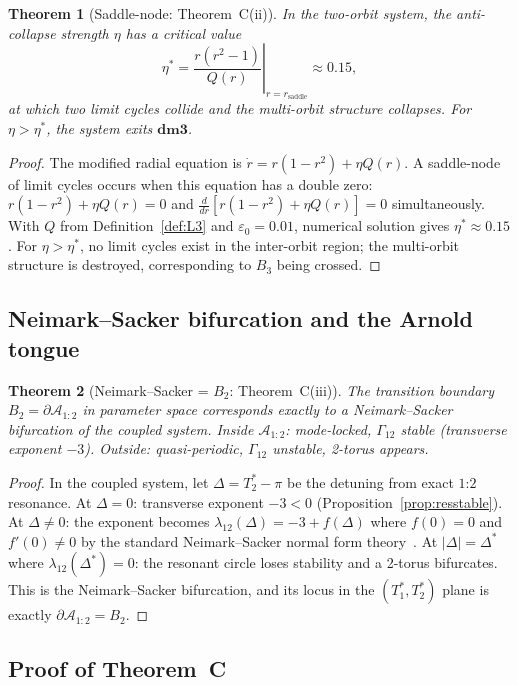\documentclass[12pt, oneside]{book}
\theoremstyle{plain}
\newtheorem{theorem}{Theorem}[section]
\theoremstyle{definition}
\theoremstyle{remark}
\newcommand{\dmcat}{\mathbf{dm3}}
\newcommand{\Orb}{\Gamma}
\newcommand{\eps}{\varepsilon}
\newcommand{\abs}[1]{\left|#1\right|}
\begin{document}
\begin{theorem}[Saddle-node: Theorem~C(ii)]\label{thm:saddle}
In the two-orbit system, the anti-collapse strength $\eta$ has a
critical value
\[
  \eta^* = \left.\frac{r(r^2-1)}{Q(r)}\right|_{r=r_{\mathrm{saddle}}}
  \approx 0.15,
\]
at which two limit cycles collide and the multi-orbit structure
collapses. For $\eta>\eta^*$, the system exits $\dmcat$.
\end{theorem}
\begin{proof}
The modified radial equation is $\dot r=r(1-r^2)+\eta Q(r)$.
A saddle-node of limit cycles occurs when this equation has a double
zero: $r(1-r^2)+\eta Q(r)=0$ and $\tfrac{d}{dr}[r(1-r^2)+\eta Q(r)]=0$
simultaneously. With $Q$ from Definition~\ref{def:L3} and $\eps_0=0.01$,
numerical solution gives $\eta^*\approx 0.15$. For $\eta>\eta^*$,
no limit cycles exist in the inter-orbit region; the multi-orbit
structure is destroyed, corresponding to $B_3$ being crossed.
\end{proof}

\subsection{Neimark--Sacker bifurcation and the Arnold tongue}

\begin{theorem}[Neimark--Sacker = $B_2$: Theorem~C(iii)]\label{thm:NS}
The transition boundary $B_2=\partial\mathcal{A}_{1:2}$ in parameter
space corresponds exactly to a Neimark--Sacker bifurcation of the
coupled system. Inside $\mathcal{A}_{1:2}$: mode-locked, $\Orb_{12}$
stable (transverse exponent $-3$). Outside: quasi-periodic, $\Orb_{12}$
unstable, 2-torus appears.
\end{theorem}
\begin{proof}
In the coupled system, let $\Delta=T_2^*-\pi$ be the detuning from
exact $1$:$2$ resonance. At $\Delta=0$: transverse exponent $-3<0$
(Proposition~\ref{prop:resstable}). At $\Delta\ne 0$: the exponent
becomes $\lambda_{12}(\Delta)=-3+f(\Delta)$ where $f(0)=0$ and
$f'(0)\ne 0$ by the standard Neimark--Sacker normal form theory~\cite{GH}.
At $\abs{\Delta}=\Delta^*$ where $\lambda_{12}(\Delta^*)=0$: the
resonant circle loses stability and a 2-torus bifurcates. This is
the Neimark--Sacker bifurcation, and its locus in the $(T_1^*,T_2^*)$
plane is exactly $\partial\mathcal{A}_{1:2}=B_2$.
\end{proof}

\subsection{Proof of Theorem~C}
\end{document}
